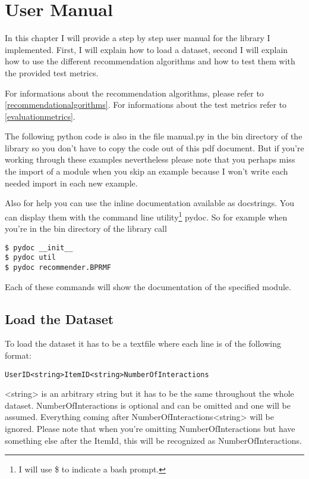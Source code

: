 \chapter{User Manual}
In this chapter I will provide a step by step user manual for the library I implemented\cite{recsyslab}.
First, I will explain how to load a dataset, second I
will explain how to use the different recommendation algorithms and
how to test them with the provided test metrics. 

For informations about the recommendation algorithms, please refer to \ref{recommendationalgorithms}.
For informations about the test metrics refer to \ref{evaluationmetrics}.

The following python code is also in the file manual.py in the bin directory of the library
so you don't have to copy the code out of this pdf document. But if you're working through these examples
nevertheless please note that you perhaps miss the import of a module when you skip an example because
I won't write each needed import in each new example.

Also for help you can use the inline documentation available as docstrings.
You can display them with the command line utility\footnote{I will use \$ to indicate a bash prompt.} pydoc.
So for example when you're in the bin directory of the library call

\begin{lstlisting}
$ pydoc __init__
$ pydoc util 
$ pydoc recommender.BPRMF
\end{lstlisting}
Each of these commands will show the documentation of the specified module.


\section{Load the Dataset}
To load the dataset it has to be a textfile where each line is of the following format:
\begin{lstlisting}
UserID<string>ItemID<string>NumberOfInteractions
\end{lstlisting}
<string> is an arbitrary string but it has to be the same throughout the whole dataset.
NumberOfInteractions is optional and can be omitted and one will be assumed.
Everything coming after NumberOfInteractions<string> will be ignored.
Please note that when you're omitting NumberOfInteractions but have something else after
the ItemId, this will be recognized as NumberOfInteractions.


